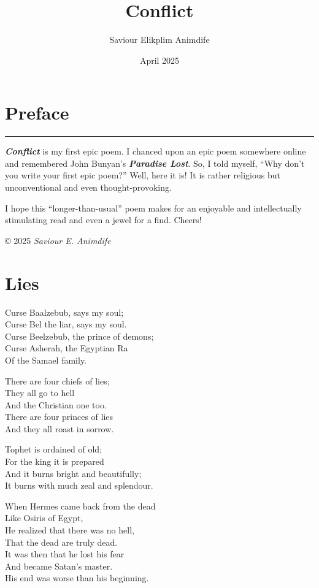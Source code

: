 \documentclass[
]{book}
\title{Conflict}
\author{Saviour Elikplim Animdife}
\date{April 2025}
\begin{document}
\maketitle

{
\setcounter{tocdepth}{1}
\tableofcontents
}
\chapter*{Preface}\label{preface}

\begin{center}\rule{0.5\linewidth}{0.5pt}\end{center}

\textbf{\emph{Conflict}} is my first epic poem. I chanced upon an epic poem somewhere online and remembered John Bunyan's \textbf{\emph{Paradise Lost}}. So, I told myself, ``Why don't you write your first epic poem?'' Well, here it is! It is rather religious but unconventional and even thought-provoking.

I hope this ``longer-than-usual'' poem makes for an enjoyable and intellectually stimulating read and even a jewel for a find. Cheers!

© 2025 \emph{Saviour E. Animdife}

\chapter{Lies}\label{lies}

Curse Baalzebub, says my soul;\\
Curse Bel the liar, says my soul.\\
Curse Beelzebub, the prince of demons;\\
Curse Asherah, the Egyptian Ra\\
Of the Samael family.

There are four chiefs of lies;\\
They all go to hell\\
And the Christian one too.\\
There are four princes of lies\\
And they all roast in sorrow.

Tophet is ordained of old;\\
For the king it is prepared\\
And it burns bright and beautifully;\\
It burns with much zeal and splendour.

When Hermes came back from the dead\\
Like Osiris of Egypt,\\
He realized that there was no hell,\\
That the dead are truly dead.\\
It was then that he lost his fear\\
And became Satan's master.\\
His end was worse than his beginning.
\end{document}
